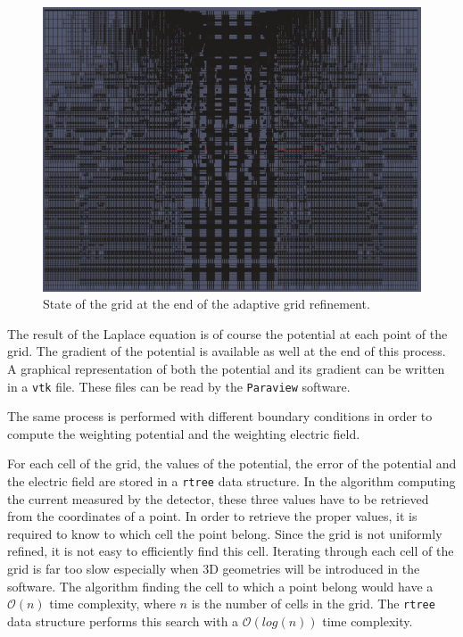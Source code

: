 \documentclass[11pt]{article}
\begin{document}
	\begin{figure}[H]
	  \center
	  \includegraphics[scale=0.3]{images/grid_refinement/high_refinement.png}
	  \caption{State of the grid at the end of the adaptive grid refinement.}
		\label{fig:high_refinement}
	\end{figure}

	The result of the Laplace equation is of course the potential at each point of
	the grid. The gradient of the potential is available as well at
	the end of this process. A graphical representation of both the potential and
	its gradient can be written in a \texttt{vtk} file.
	These files can be read by the \texttt{Paraview} software.

	The same process is performed with different boundary conditions in order
	to compute the weighting potential and the weighting electric field.

	For each cell of the grid, the values of the potential, the error of the
	potential and the electric field are stored in a \texttt{rtree} data structure.
	In the algorithm computing the current measured by the detector, these three
	values have to be retrieved from the coordinates of a point. In order to retrieve the proper
	values, it is required to know to which cell the point belong. Since the grid
	is not uniformly refined, it is not easy to efficiently find this cell.
	Iterating through each cell of the grid is far too slow especially when 3D
	geometries will be introduced in the software. The algorithm finding the cell
	to which a point belong would have a $\mathcal{O}(n)$ time complexity, where $n$
	is the number of cells in the grid. The \texttt{rtree} data structure
	performs this search with a $\mathcal{O}(log(n))$ time complexity.
\end{document}
